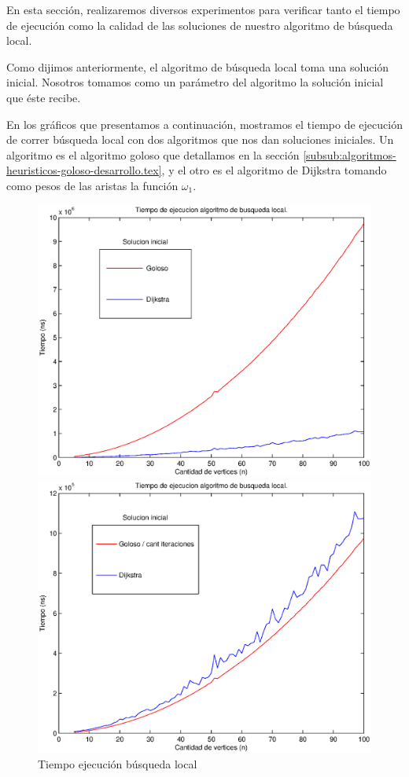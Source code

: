 En esta sección, realizaremos diversos experimentos para verificar tanto el tiempo de ejecución como la calidad de las soluciones de nuestro algoritmo de búsqueda local.

Como dijimos anteriormente, el algoritmo de búsqueda local toma una solución inicial. Nosotros tomamos como un parámetro del algoritmo la solución inicial que éste recibe.

En los gráficos que presentamos a continuación, mostramos el tiempo de ejecución de correr búsqueda local con dos algoritmos que nos dan soluciones iniciales. Un algoritmo es el algoritmo goloso que detallamos en la sección \ref{subsub:algoritmos-heuristicos-goloso-desarrollo.tex}, y el otro es el algoritmo de Dijkstra tomando como pesos de las aristas la función $\omega_1$.

\begin{figure}[H]
  \begin{minipage}{0.5\linewidth}
    \includegraphics[width=\linewidth]{graficos/busq_local_tiempo.eps}
    \caption{Tiempo ejecución búsqueda local}\label{fig:busq-local-tiempo}
  \end{minipage}
  \hfill
  \begin{minipage}{0.5\linewidth}
    \includegraphics[width=\linewidth]{graficos/busq_local_tiempo_divido10.eps}

\end{minipage}
\end{figure}
